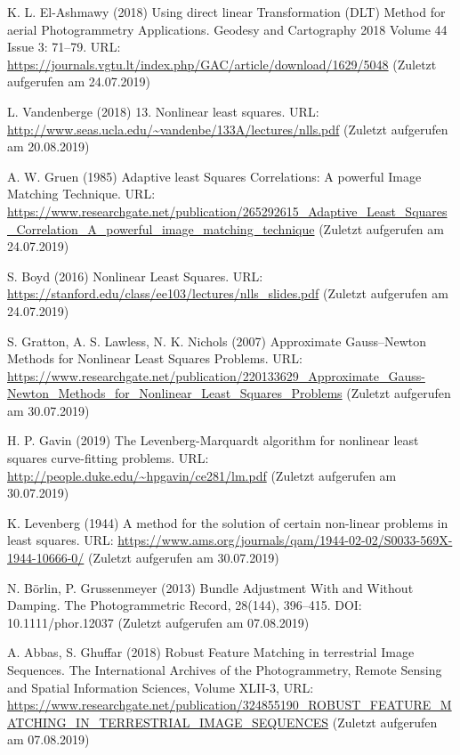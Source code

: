 \documentclass[12pt,oneside]{scrreprt}
\begin{document}
\begin{thebibliography}{10}
 K. L. El-Ashmawy (2018) Using direct linear Transformation (DLT) Method for
aerial Photogrammetry Applications. Geodesy and Cartography 2018 Volume 44 Issue 3: 71–79. URL: \url{https://journals.vgtu.lt/index.php/GAC/article/download/1629/5048} (Zuletzt aufgerufen am 24.07.2019)

 L. Vandenberge (2018) 13. Nonlinear least squares. URL: \url{http://www.seas.ucla.edu/~vandenbe/133A/lectures/nlls.pdf} (Zuletzt aufgerufen am 20.08.2019)

 A. W. Gruen (1985) Adaptive least Squares Correlations:
A powerful Image Matching Technique. URL: \url{https://www.researchgate.net/publication/265292615_Adaptive_Least_Squares_Correlation_A_powerful_image_matching_technique}  (Zuletzt aufgerufen am 24.07.2019)

 S. Boyd (2016) Nonlinear Least Squares. URL: \url{https://stanford.edu/class/ee103/lectures/nlls_slides.pdf} (Zuletzt aufgerufen am 24.07.2019)

 S. Gratton, A. S. Lawless, N. K. Nichols (2007) Approximate Gauss–Newton Methods for Nonlinear Least Squares Problems. URL: \url{https://www.researchgate.net/publication/220133629_Approximate_Gauss-Newton_Methods_for_Nonlinear_Least_Squares_Problems} (Zuletzt aufgerufen am 30.07.2019)

 H. P. Gavin (2019) The Levenberg-Marquardt algorithm for
nonlinear least squares curve-fitting problems. URL: \url{http://people.duke.edu/~hpgavin/ce281/lm.pdf} (Zuletzt aufgerufen am 30.07.2019)

 K. Levenberg (1944) A method for the solution of certain non-linear problems in least squares. URL: \url{https://www.ams.org/journals/qam/1944-02-02/S0033-569X-1944-10666-0/} (Zuletzt aufgerufen am 30.07.2019)

 N. Börlin, P. Grussenmeyer (2013) Bundle Adjustment With and Without Damping. The Photogrammetric Record, 28(144), 396–415. DOI: 10.1111/phor.12037 (Zuletzt aufgerufen am 07.08.2019)

 A. Abbas, S. Ghuffar (2018) Robust Feature Matching in terrestrial Image Sequences. The International Archives of the Photogrammetry, Remote Sensing and Spatial Information Sciences, Volume XLII-3, URL: \url{https://www.researchgate.net/publication/324855190_ROBUST_FEATURE_MATCHING_IN_TERRESTRIAL_IMAGE_SEQUENCES} (Zuletzt aufgerufen am 07.08.2019)


\end{thebibliography}
\end{document}
